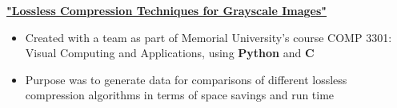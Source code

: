 \textbf{\href{https://github.com/EthanDenny/visual-computing-course-project}{"Lossless Compression Techniques for Grayscale Images"}} \par
\begin{itemize}
	\item Created with a team as part of Memorial University's course COMP 3301: Visual Computing and Applications, using \textbf{Python} and \textbf{C}
	\item Purpose was to generate data for comparisons of different lossless compression algorithms in terms of space savings and run time
\end{itemize}\vspace{0.1cm} \par
